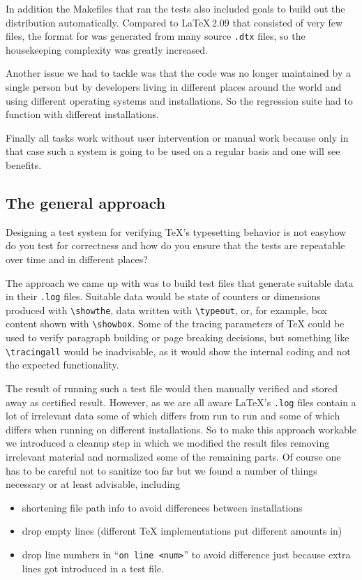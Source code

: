 \documentclass[a4paper]{ltugboat}
\begin{document}
In addition the Makefiles that ran the tests also included goals to
build out the distribution automatically.  Compared to \LaTeX\,2.09
that consisted of very few files, the format for \LaTeXe{} was
generated from many source \texttt{.dtx} files, so the housekeeping
complexity was greatly increased.

Another issue we had to tackle was that the code was no longer
maintained by a single person but by developers living in different
places around the world and using different operating systems and
installations. So the regression suite had to function with different
installations.

Finally all tasks work without user intervention or manual work because
only in that case such a system is going to be used on a regular basis
and one will see benefits.

\subsection{The general approach}

Designing a test system for verifying \TeX's typesetting behavior is
not easy\Dash how do you test for correctness and how do you ensure
that the tests are repeatable over time and in different places?

The approach we came up with was to build test files that generate
suitable data in their \texttt{.log} files. Suitable data would be
state of counters or dimensions produced with \verb|\showthe|, data
written with \verb|\typeout|, or, for example, box content shown with
\verb|\showbox|. Some of the tracing parameters of \TeX{} could be used to
verify paragraph building or page breaking decisions, but something
like \verb|\tracingall| would be inadvisable, as it would show the
internal coding and not the expected functionality.

The result of running such a test file would then manually verified
and stored away as certified result. However, as we are all aware
\LaTeX's \texttt{.log} files contain a lot of irrelevant data some of
which differs from run to run and some of which differs when running
on different installations. So to make this approach workable we
introduced a cleanup step in which we modified the result files
removing irrelevant material and normalized some of the remaining
parts. Of course one has to be careful not to sanitize too far but we
found a number of things necessary or at least advisable, including
\begin{itemize}
\item  shortening file path info to avoid differences between
installations
\item drop empty lines (different \TeX{} implementations put
different amounts in)
\item drop line numbers in ``\texttt{on line <num>}'' to avoid difference
 just because extra lines got introduced in a test file.
\end{itemize}
\end{document}
